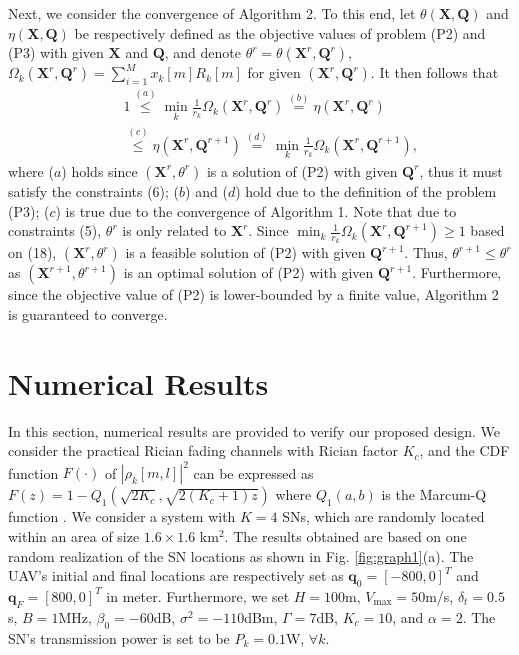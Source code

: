 \documentclass[journal]{IEEEtran}
\begin{document}
Next, we consider the convergence of Algorithm 2. To this end, let $\theta(\mathbf{X},\mathbf{Q})$ and $\eta(\mathbf{X},\mathbf{Q})$ be respectively defined as the objective values of problem (P2) and (P3) with given $\mathbf{X}$ and $\mathbf{Q}$, and denote $\theta^{r}=\theta(\mathbf{X}^r,\mathbf{Q}^r)$, $\Omega_k(\mathbf{X}^r,\mathbf{Q}^{r})=\sum_{i=1}^{M}x_k[m]R_k[m]$ for given $(\mathbf{X}^r,\mathbf{Q}^{r})$. It then follows that
\begin{eqnarray}
&&1\overset{(a)}\leq \min_{k}\frac{1}{r_k}\Omega_k(\mathbf{X}^r,\mathbf{Q}^{r})\overset{(b)}=\eta(\mathbf{X}^r,\mathbf{Q}^{r})\nonumber\\
&&\overset{(c)}\leq \eta(\mathbf{X}^r,\mathbf{Q}^{r+1})\overset{(d)}=\min_{k}\frac{1}{r_k}\Omega_k(\mathbf{X}^r,\mathbf{Q}^{r+1}),
\end{eqnarray}
where ($a$) holds since $(\mathbf{X}^r,\theta^r)$ is a solution of (P2) with given $\mathbf{Q}^{r}$, thus it must satisfy the constraints (6); ($b$) and ($d$) hold due to the definition of the problem (P3); ($c$) is true due to the convergence of Algorithm 1. Note that due to constraints (5), $\theta^{r}$ is only related to $\mathbf{X}^r$. Since $\min_{k}\frac{1}{r_k}\Omega_k(\mathbf{X}^r,\mathbf{Q}^{r+1})\geq 1$ based on (18), $(\mathbf{X}^r,\theta^r)$ is a feasible solution of (P2) with given $\mathbf{Q}^{r+1}$. Thus, $\theta^{r+1}\leq \theta^{r}$ as $(\mathbf{X}^{r+1},\theta^{r+1})$ is an optimal solution of (P2) with given $\mathbf{Q}^{r+1}$. Furthermore, since the objective value of (P2) is lower-bounded by a finite value, Algorithm 2 is guaranteed to converge.


\section{Numerical Results}\label{Problem}
In this section, numerical results are provided to verify our proposed design. We consider the practical Rician fading channels with Rician factor $K_c$, and the CDF function $F(\cdot)$ of $|\rho_k[m,l]|^2$ can be expressed as $F(z)=1-Q_1(\sqrt{2K_c}, \sqrt{2(K_c+1)z})$
where $Q_1(a, b)$ is the Marcum-Q function \cite{FOno}. We consider a system with $K=4$ SNs, which are randomly located within an area of size $1.6\times 1.6$ km$^2$. The results obtained are based on one random realization of the SN locations as shown in Fig. \ref{fig:graph1}(a). The UAV's initial and final locations are respectively set as $\mathbf{q}_0=[-800, 0]^T$ and $\mathbf{q}_{F}=[800, 0]^T$ in meter. Furthermore, we set $H=100$m, $V_{\max}=50$m/s, $\delta_t=0.5$s, $B=1$MHz, $\beta_0=-60$dB, $\sigma^2=-110$dBm, $\Gamma=7$dB, $K_c=10$, and $\alpha=2$. The SN's transmission power is set to be $P_k=0.1$W, $\forall k$.
\end{document}
